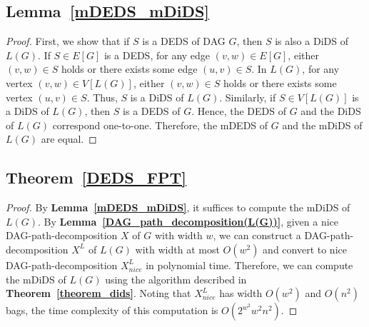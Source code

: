 \documentclass[runningheads]{llncs}
\theoremstyle{plain}
\theoremstyle{definition}
\begin{document}
\subsection{\textbf{Lemma~\ref{mDEDS_mDiDS}}}\label{appendix_B2}
\begin{proof}
    First, we show that if $S$ is a DEDS of DAG $G$, then $S$ is also a DiDS of $L(G)$. If $S\in E[G]$ is a DEDS, for any edge $(v, w) \in E[G]$, either $(v, w) \in S$ holds or there exists some edge $(u, v) \in S$. In $L(G)$, for any vertex $(v, w) \in V[L(G)]$, either $(v, w) \in S$ holds or there exists some vertex $(u, v) \in S$. Thus, $S$ is a DiDS of $L(G)$. Similarly, if $S \in V[L(G)]$ is a DiDS of $L(G)$, then $S$ is a DEDS of $G$. Hence, the DEDS of $G$ and the DiDS of $L(G)$ correspond one-to-one. Therefore, the mDEDS of $G$ and the mDiDS of $L(G)$ are equal.
\end{proof}


\subsection{\textbf{Theorem~\ref{DEDS_FPT}}}\label{appendix_B3}
\begin{proof}
    By \textbf{Lemma~\ref{mDEDS_mDiDS}}, it suffices to compute the mDiDS of $L(G)$. By \textbf{Lemma~\ref{DAG_path_decomposition(L(G))}}, given a nice DAG-path-decomposition $X$ of $G$ with width $w$, we can construct a DAG-path-decomposition $X^L$ of $L(G)$ with width at most $O(w^2)$ and convert to nice DAG-path-decomposition $X^L_{nice}$ in polynomial time. Therefore, we can compute the mDiDS of $L(G)$ using the algorithm described in \textbf{Theorem~\ref{theorem_dids}}. Noting that $X^L_{nice}$ has width $O(w^2)$ and $O(n^2)$ bags, the time complexity of this computation is $O(2^{w^2}w^2n^2)$.
\end{proof}
\end{document}
